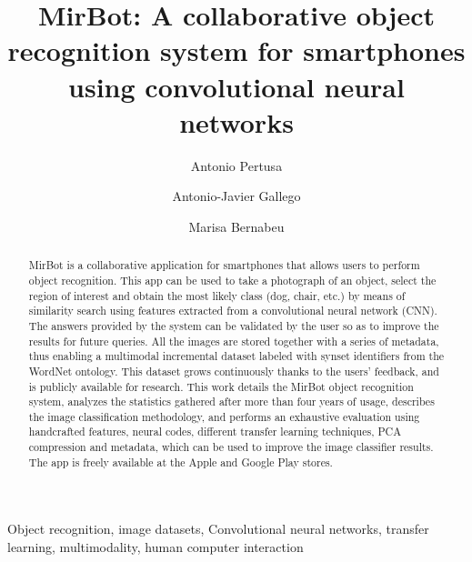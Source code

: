 \documentclass[final, twocolumn]{elsarticle}
\begin{document}
%

\begin{frontmatter}

\title{MirBot: A collaborative object recognition system for smartphones using convolutional neural networks}

\author{Antonio Pertusa}
\author{Antonio-Javier Gallego}
\author{Marisa Bernabeu}
\address{Dpto. Lenguajes y Sistemas Inform\'{a}ticos, Universidad de Alicante, E-03690, San Vicente del Raspeig, Alicante, Spain}



\begin{abstract}
MirBot is a collaborative application for smartphones that allows users to perform object recognition. This app can be used to take a photograph of an object, select the region of interest and obtain the most likely class (dog, chair, etc.) by means of similarity search using features extracted from a convolutional neural network (CNN). The answers provided by the system can be validated by the user so as to improve the results for future queries. All the images are stored together with a series of metadata, thus enabling a multimodal incremental dataset labeled with synset identifiers from the WordNet ontology. This dataset grows continuously thanks to the users' feedback, and is publicly available for research. This work details the MirBot object recognition system, analyzes the statistics gathered after more than four years of usage, describes the image classification methodology, and performs an exhaustive evaluation using handcrafted features, neural codes, different transfer learning techniques, PCA compression and metadata, which can be used to improve the image classifier results. %
The app is freely available at the Apple and Google Play stores. 
\end{abstract}

\begin{keyword}
Object recognition, image datasets, Convolutional neural networks, transfer learning, multimodality, human computer interaction
\end{keyword}


\end{frontmatter}
\end{document}

